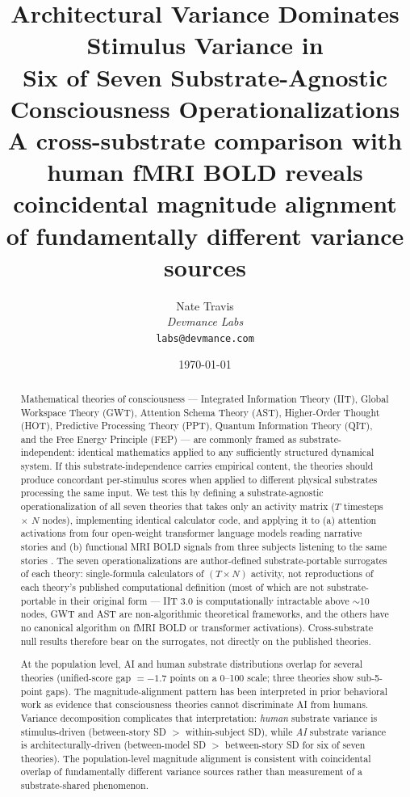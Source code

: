 \documentclass[11pt,a4paper]{article}
\title{Architectural Variance Dominates Stimulus Variance in\\Six of Seven Substrate-Agnostic Consciousness Operationalizations\\[6pt]
\large{A cross-substrate comparison with human fMRI BOLD reveals coincidental magnitude alignment of fundamentally different variance sources}}
\author{Nate Travis\\[3pt]
\textit{Devmance Labs}\\
\texttt{labs@devmance.com}}
\date{\today}
\begin{document}
\maketitle

\begin{abstract}
\noindent
Mathematical theories of consciousness --- Integrated Information Theory (IIT), Global Workspace Theory (GWT), Attention Schema Theory (AST), Higher-Order Thought (HOT), Predictive Processing Theory (PPT), Quantum Information Theory (QIT), and the Free Energy Principle (FEP) --- are commonly framed as substrate-independent: identical mathematics applied to any sufficiently structured dynamical system. If this substrate-independence carries empirical content, the theories should produce concordant per-stimulus scores when applied to different physical substrates processing the same input. We test this by defining a substrate-agnostic operationalization of all seven theories that takes only an activity matrix ($T$ timesteps $\times$ $N$ nodes), implementing identical calculator code, and applying it to (a) attention activations from four open-weight transformer language models reading narrative stories and (b) functional MRI BOLD signals from three subjects listening to the same stories \citep{lebel2023natural}. The seven operationalizations are author-defined substrate-portable surrogates of each theory: single-formula calculators of $(T \times N)$ activity, not reproductions of each theory's published computational definition (most of which are not substrate-portable in their original form --- IIT 3.0 is computationally intractable above $\sim$10 nodes, GWT and AST are non-algorithmic theoretical frameworks, and the others have no canonical algorithm on fMRI BOLD or transformer activations). Cross-substrate null results therefore bear on the surrogates, not directly on the published theories.

At the population level, AI and human substrate distributions overlap for several theories (unified-score gap $=-1.7$ points on a 0--100 scale; three theories show sub-5-point gaps). The magnitude-alignment pattern has been interpreted in prior behavioral work as evidence that consciousness theories cannot discriminate AI from humans. Variance decomposition complicates that interpretation: \emph{human} substrate variance is stimulus-driven (between-story SD $>$ within-subject SD), while \emph{AI} substrate variance is architecturally-driven (between-model SD $>$ between-story SD for six of seven theories). The population-level magnitude alignment is consistent with coincidental overlap of fundamentally different variance sources rather than measurement of a substrate-shared phenomenon.


\end{abstract}
\end{document}
